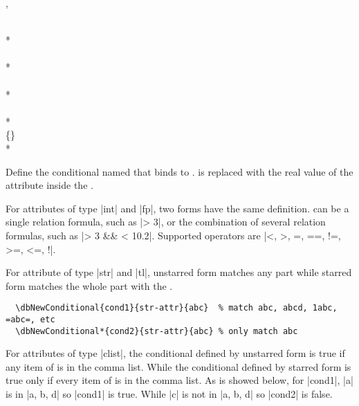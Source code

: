 \documentclass[full]{l3doc}
\begin{document}
\begin{documentation}
\begin{function}{\dbNewConditional, \dbNewConditional*}
  \begin{syntax}
                \\
    *           \\[2pt]
         \\
    *    \\
         \\
    *    \\
          \\
    *     \\
          \{\textbar{}\} \\
    *     
  \end{syntax}

  Define the conditional named  that binds to . 
  is replaced with the real value of the attribute inside the .
\end{function}

For attributes of type |int| and |fp|, two forms have the same definition.
 can be a single relation formula, such as |\dbval > 3|, or the
combination of several relation formulas, such as |\dbval > 3 && \dbval < 10.2|.
Supported operators are |<, >, =, ==, !=, >=, <=, !|.

For attribute of type |str| and |tl|, unstarred form matches any part while
starred form matches the whole part with the .
\begin{verbatim}
  \dbNewConditional{cond1}{str-attr}{abc}  % match abc, abcd, 1abc, =abc=, etc
  \dbNewConditional*{cond2}{str-attr}{abc} % only match abc
\end{verbatim}

For attributes of type |clist|, the conditional defined by unstarred form is
true if any item of  is in the comma list. While the
conditional defined by starred form is true only if every item of  is in the comma list. As is showed below, for |cond1|, |a| is in
|{a, b, d}| so |cond1| is true. While |c| is not in |{a, b, d}| so |cond2| is
false.


\end{documentation}
\end{document}
